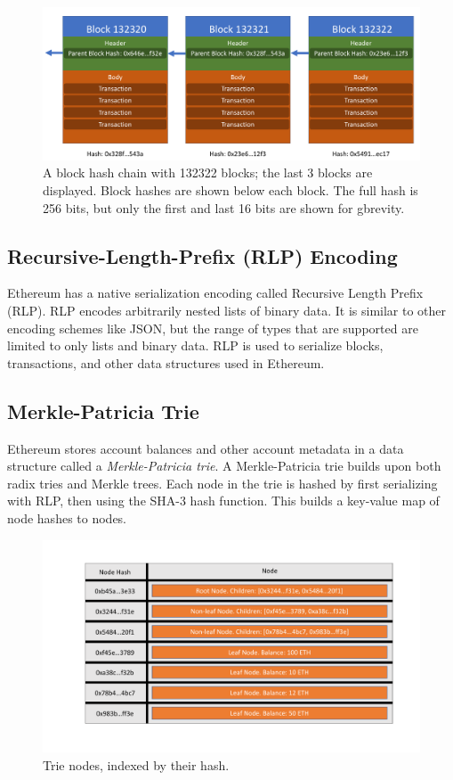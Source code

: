 \documentclass[12pt]{article}
\begin{document}
\begin{figure}[H]
  \centering
  \includegraphics[width=\textwidth]{../figures/background/blocks/blocks.pdf}
  \caption{A block hash chain with 132322 blocks; the last 3 blocks are displayed. Block hashes are shown below each block. The full hash is 256 bits, but only the first and last 16 bits are shown for gbrevity.}
\end{figure}


\subsection{Recursive-Length-Prefix (RLP) Encoding}

Ethereum has a native serialization encoding called Recursive Length Prefix (RLP). RLP encodes arbitrarily nested lists of binary data. It is similar to other encoding schemes like JSON, but the range of types that are supported are limited to only lists and binary data. RLP is used to serialize blocks, transactions, and other data structures used in Ethereum.

\subsection{Merkle-Patricia Trie}

Ethereum stores account balances and other account metadata in a data structure called a \emph{Merkle-Patricia trie}. A Merkle-Patricia trie builds upon both radix tries and Merkle trees. Each node in the trie is hashed by first serializing with RLP, then using the SHA-3 hash function. This builds a key-value map of node hashes to nodes.

\begin{figure}[H]
  \centering
  \includegraphics[width=\textwidth]{../figures/background/trie/tree_nodes.pdf}
  \caption{Trie nodes, indexed by their hash.} \label{fig:trienodes}
\end{figure}
\end{document}
